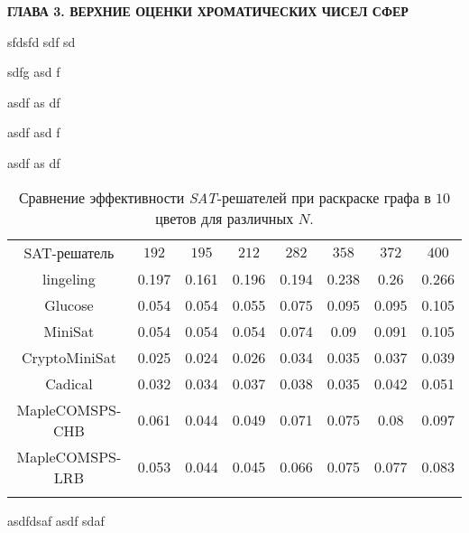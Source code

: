 \newpage
\begin{center}
\noindent\textbf{ГЛАВА 3. ВЕРХНИЕ ОЦЕНКИ ХРОМАТИЧЕСКИХ ЧИСЕЛ СФЕР}\label{chapters:3}
\vspace{1.5mm}
\end{center}

sfdsfd sdf sd

sdfg asd f


asdf as df


asdf asd f


asdf as df

\begin{table}[h]
\centering
\captionsetup{justification=centering}
\caption{Сравнение эффективности \textit{SAT}-решателей при раскраске графа в $10$ цветов для различных $N$.} 
\label{chapter3:tab:color10}
\begin{tabular}{@{}|c|c|c|c|c|c|c|c|} 
\Xhline{4\arrayrulewidth}
SAT-решатель          & $192$ & $195$ & $212$ & $282$ & $358$ & $372$ & $400$ \\ \Xhline{4\arrayrulewidth}
lingeling             & 0.197 & 0.161 & 0.196 & 0.194 & 0.238 & 0.26  & 0.266 \\ \hline
Glucose               & 0.054 & 0.054 & 0.055 & 0.075 & 0.095 & 0.095 & 0.105 \\ \hline
MiniSat               & 0.054 & 0.054 & 0.054 & 0.074 & 0.09  & 0.091 & 0.105 \\ \hline
CryptoMiniSat         & 0.025 & 0.024 & 0.026 & 0.034 & 0.035 & 0.037 & 0.039 \\ \hline
Cadical               & 0.032 & 0.034 & 0.037 & 0.038 & 0.035 & 0.042 & 0.051 \\ \hline
MapleCOMSPS-CHB       & 0.061 & 0.044 & 0.049 & 0.071 & 0.075 & 0.08  & 0.097 \\ \hline
MapleCOMSPS-LRB       & 0.053 & 0.044 & 0.045 & 0.066 & 0.075 & 0.077 & 0.083 \\ \Xhline{4\arrayrulewidth}
\end{tabular}
\end{table}

asdfdsaf
asdf
sdaf


